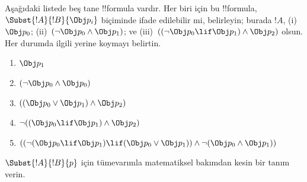 \begin{prob} Aşağıdaki listede beş tane !!{formula} vardır. Her biri için bu
 !!{formula}, \( \Subst{!A}{!B}{\Obj p_i} \) biçiminde ifade edilebilir mi,
 belirleyin; burada \( !A \), (i)~\( \Obj p_0 \); (ii)~\( ( \lnot \Obj p_0
 \land \Obj p_1) \); ve (iii)~\( ( ( \lnot \Obj p_0 \lif \Obj p_1 ) \land
 \Obj p_2 ) \) olsun. Her durumda ilgili yerine koymayı belirtin.
  \begin{enumerate}
    \item \( \Obj p_1 \) 
    \item \( ( \lnot \Obj p_0 \land \Obj p_0 ) \)
    \item \( ( ( \Obj p_0 \lor \Obj p_1 ) \land \Obj p_2 )  \)
    \item \( \lnot ( ( \Obj p_0 \lif \Obj p_1 ) \land \Obj p_2 ) \)
    \item \( (( \lnot ( \Obj p_0 \lif \Obj p_1 ) \lif ( \Obj p_0 \lor \Obj p_1 )) \land \lnot ( \Obj p_0 \land \Obj p_1 )) \)
  \end{enumerate}
\end{prob}

\begin{prob}
$\Subst{!A}{!B}{p}$ için tümevarımla matematiksel bakımdan kesin bir tanım
verin.
\end{prob}

